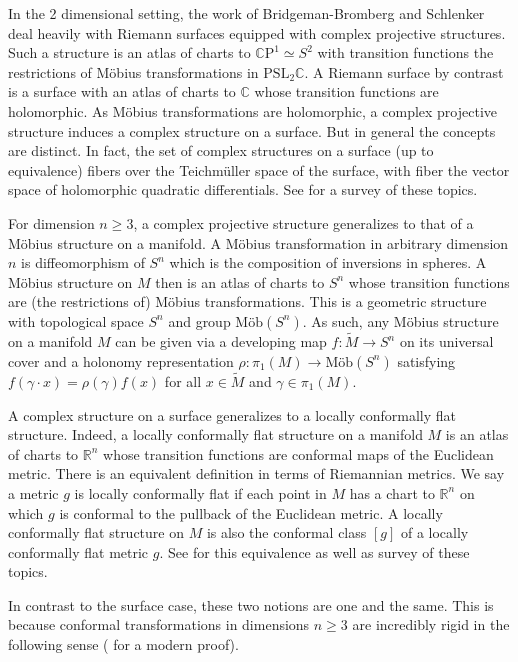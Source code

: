 \documentclass{amsart}
\newcommand{\R}{\mathbb{R}}
\newcommand{\C}{\mathbb{C}}
\newcommand{\CP}{\mathbb{C}\mathrm{P}}
\begin{document}
In the 2 dimensional setting, the work of Bridgeman-Bromberg \cite{Bridgeman-Bromberg2022} and Schlenker \cite{Schlenker2017} deal heavily with Riemann surfaces equipped with complex projective structures.
Such a structure is an atlas of charts to $\CP^1 \simeq S^2$ with transition functions the restrictions of M\"obius transformations in $\mathrm{PSL}_2\C$.
A Riemann surface by contrast is a surface with an atlas of charts to $\C$ whose transition functions are holomorphic. 
As M\"obius transformations are holomorphic, a complex projective structure induces a complex structure on a surface.
But in general the concepts are distinct. 
In fact, the set of complex structures on a surface (up to equivalence) fibers over the Teichm\"uller space of the surface, with fiber the vector space of holomorphic quadratic differentials.
See \cite{Dumas2009} for a survey of these topics. 

For dimension $n \geq 3$, a complex projective structure generalizes to that of a M\"obius structure on a manifold.
A M\"obius transformation in arbitrary dimension $n$ is diffeomorphism of $S^n$ which is the composition of inversions in spheres. 
A M\"obius structure on $M$ then is an atlas of charts to $S^n$ whose transition functions are (the restrictions of) M\"obius transformations.
This is a geometric structure with topological space $S^n$ and group $\text{M\"ob}(S^n)$. 
As such, any M\"obius structure on a manifold $M$ can be given via a developing map $f: \tilde{M} \to S^n$ on its universal cover and a holonomy representation $\rho: \pi_1(M) \to \text{M\"ob}(S^n)$ satisfying $f(\gamma \cdot x) = \rho(\gamma)f(x)$ for all $x \in \tilde{M}$ and $\gamma \in \pi_1(M)$.

A complex structure on a surface generalizes to a locally conformally flat structure.
Indeed, a locally conformally flat structure on a manifold $M$ is an atlas of charts to $\R^n$ whose transition functions are conformal maps of the Euclidean metric.
There is an equivalent definition in terms of Riemannian metrics.
We say a metric $g$ is locally conformally flat if each point in $M$ has a chart to $\R^n$ on which $g$ is conformal to the pullback of the Euclidean metric.
A locally conformally flat structure on $M$ is also the conformal class $[g]$ of a locally conformally flat metric $g$.
See \cite{Matsumoto1992} for this equivalence as well as survey of these topics.


In contrast to the surface case, these two notions are one and the same.
This is because conformal transformations in dimensions $n \geq 3$ are incredibly rigid in the following sense (\cite{Matsumoto1992} for a modern proof).
\end{document}
